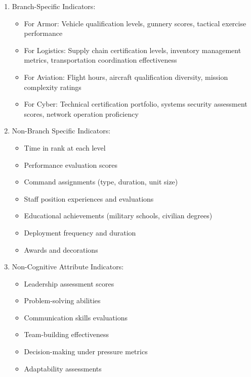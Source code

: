 \documentclass[
  letterpaper,
  DIV=11,
  numbers=noendperiod]{scrartcl}
\providecommand{\tightlist}{%
  \setlength{\itemsep}{0pt}\setlength{\parskip}{0pt}}
\begin{document}
\begin{enumerate}
\def\labelenumi{\arabic{enumi}.}
\tightlist
\item
  Branch-Specific Indicators:

  \begin{itemize}
  \tightlist
  \item
    For Armor: Vehicle qualification levels, gunnery scores, tactical
    exercise performance
  \item
    For Logistics: Supply chain certification levels, inventory
    management metrics, transportation coordination effectiveness
  \item
    For Aviation: Flight hours, aircraft qualification diversity,
    mission complexity ratings
  \item
    For Cyber: Technical certification portfolio, systems security
    assessment scores, network operation proficiency
  \end{itemize}
\item
  Non-Branch Specific Indicators:

  \begin{itemize}
  \tightlist
  \item
    Time in rank at each level
  \item
    Performance evaluation scores
  \item
    Command assignments (type, duration, unit size)
  \item
    Staff position experiences and evaluations
  \item
    Educational achievements (military schools, civilian degrees)
  \item
    Deployment frequency and duration
  \item
    Awards and decorations
  \end{itemize}
\item
  Non-Cognitive Attribute Indicators:

  \begin{itemize}
  \tightlist
  \item
    Leadership assessment scores
  \item
    Problem-solving abilities
  \item
    Communication skills evaluations
  \item
    Team-building effectiveness
  \item
    Decision-making under pressure metrics
  \item
    Adaptability assessments
  \end{itemize}
\end{enumerate}
\end{document}
